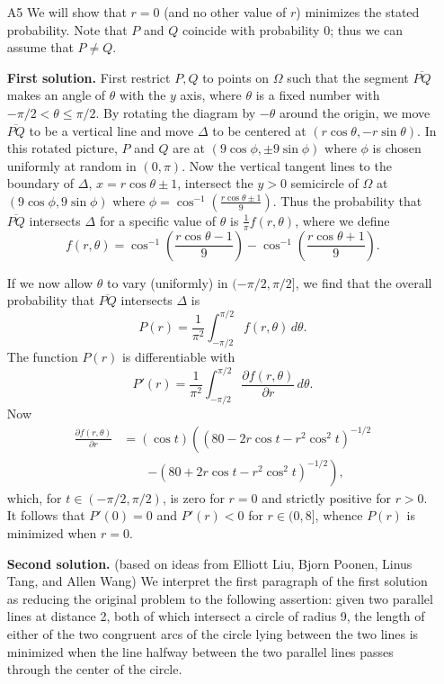 \documentclass[amssymb,twocolumn,pra,10pt,aps]{revtex4-1}
\begin{document}
\begin{itemize}
\item[A5]
We will show that $r=0$ (and no other value of $r$) minimizes the stated probability.
Note that $P$ and $Q$ coincide with probability $0$; thus we can assume that $P\neq Q$.

\noindent
\textbf{First solution.}
First restrict $P,Q$ to points on $\Omega$ such that the segment $\overline{PQ}$ makes an angle of $\theta$ with the $y$ axis, where $\theta$ is a fixed number with $-\pi/2<\theta\leq\pi/2$. By rotating the diagram by $-\theta$ around the origin, we move $\overline{PQ}$ to be a vertical line and move $\Delta$ to be centered at $(r\cos\theta,-r\sin\theta)$. In this rotated picture, $P$ and $Q$ are at $(9\cos\phi,\pm 9\sin\phi)$ where $\phi$ is chosen uniformly at random in $(0,\pi)$. Now the vertical tangent lines to the boundary of $\Delta$, $x=r\cos\theta\pm 1$, intersect the $y>0$ semicircle of $\Omega$ at $(9\cos\phi,9\sin\phi)$ where $\phi = \cos^{-1}\left(\frac{r\cos\theta\pm 1}{9}\right)$. Thus the probability that $\overline{PQ}$ intersects $\Delta$ for a specific value of $\theta$ is
$\frac{1}{\pi} f(r,\theta)$, where we define 
\[
f(r,\theta) = \cos^{-1} \left(\frac{r\cos\theta-1}{9}\right) - \cos^{-1}\left(\frac{r\cos\theta+1}{9}\right).
\]

If we now allow $\theta$ to vary (uniformly) in $(-\pi/2,\pi/2]$, we find that the overall probability that $\overline{PQ}$ intersects $\Delta$ is
\[
P(r) = \frac{1}{\pi^2} \int_{-\pi/2}^{\pi/2} f(r,\theta)\,d\theta.
\]
The function $P(r)$ is differentiable with 
\[
P'(r) = \frac{1}{\pi^2} \int_{-\pi/2}^{\pi/2} \frac{\partial f(r,\theta)}{\partial r}\,d\theta.
\]
Now
\begin{align*}
\frac{\partial f(r,\theta)}{\partial r} &= (\cos t)\left((80-2r\cos t-r^2\cos^2 t)^{-1/2} \right. \\
&\qquad \left. -(80+2r\cos t-r^2\cos^2 t)^{-1/2}\right),
\end{align*}
which, for $t\in (-\pi/2,\pi/2)$, is zero for $r=0$ and strictly positive for $r>0$. It follows that $P'(0)=0$ and $P'(r)<0$ for $r\in (0,8]$, whence $P(r)$ is minimized when $r=0$.

\noindent
\textbf{Second solution.} (based on ideas from Elliott Liu, Bjorn Poonen, Linus Tang, and Allen Wang)
We interpret the first paragraph of the first solution as reducing the original problem to the following assertion:
given two parallel lines at distance 2, both of which intersect a circle of radius 9, 
the length of either of the two congruent arcs of the circle lying between the two lines is minimized when the line halfway between the two parallel lines passes through the center of the circle.


\end{itemize}
\end{document}
